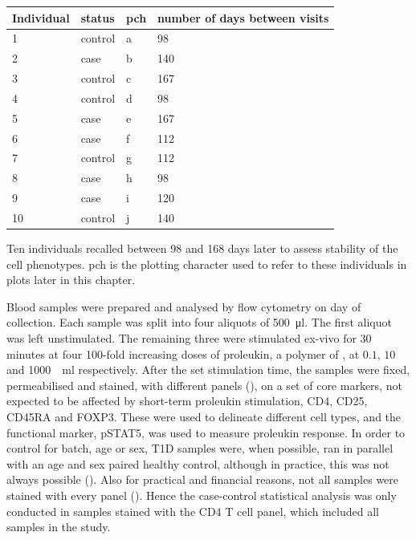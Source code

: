 \begin{table}[ht]
\centering
\begin{tabular}{llll}
  \hline
Individual & status  & pch & number of days between visits \\
  \hline
1          & control & a   & 98 \\
2          & case    & b   & 140 \\
3          & control & c   & 167 \\
4          & control & d   & 98 \\
5          & case    & e   & 167 \\
6          & case    & f   & 112 \\
7          & control & g   & 112 \\
8          & case    & h   & 98 \\
9          & case    & i   & 120 \\
10         & control & j   & 140 \\
   \hline
\end{tabular}
{Ten individuals recalled between 98 and 168 days later to assess stability of the cell phenotypes. }
{
pch is the plotting character used to refer to these individuals in plots later in this chapter.
}
\end{table}
Blood samples were prepared and analysed by flow cytometry on day of collection.
Each sample was split into four aliquots of \SI{500}{\micro\litre}.
The first aliquot was left unstimulated.
The remaining three were stimulated ex-vivo for 30 minutes at four 100-fold increasing doses
of proleukin, a polymer of , at $0.1$, $10$ and \SI{1000}{\unit\per\milli\litre} respectively.
After the set stimulation time, the samples were fixed, permeabilised and stained, with different panels (), 
on a set of core markers, not expected to be affected by short-term proleukin stimulation,
CD4, CD25, CD45RA and FOXP3.
These were used to delineate different cell types, and the functional marker, pSTAT5,
was used to measure proleukin response.
In order to control for batch, age or sex, \gls{T1D} samples were, when possible, ran in parallel with an age and sex paired healthy control, although in practice, this was not always possible ().
Also for practical and financial reasons, not all samples were stained with every panel ().
Hence the case-control statistical analysis was only conducted in samples stained with the CD4 T cell panel, which included all samples in the study.

